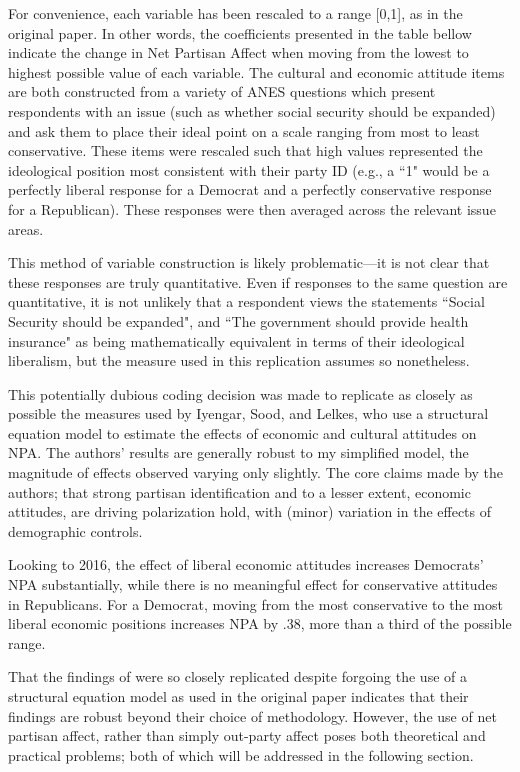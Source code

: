 \documentclass[12pt]{article}
\begin{document}
For convenience, each variable has been rescaled to a range [0,1], as in the original paper. In other words, the coefficients presented in the table bellow indicate the change in Net Partisan Affect when moving from the lowest to highest possible value of each variable. The cultural and economic attitude items are both constructed from a variety of ANES questions which present respondents with an issue (such as whether social security should be expanded) and ask them to place their ideal point on a scale ranging from most to least conservative. These items were rescaled such that high values represented the ideological position most consistent with their party ID (e.g., a ``1" would be a perfectly liberal response for a Democrat and a perfectly conservative response for a Republican). These responses were then averaged across the relevant issue areas.

This method of variable construction is likely problematic---it is not clear that these responses are truly quantitative. Even if responses to the same question are quantitative, it is not unlikely that a respondent views the statements ``Social Security should be expanded", and ``The government should provide health insurance" as being mathematically equivalent in terms of their ideological liberalism, but the measure used in this replication assumes so nonetheless.

This potentially dubious coding decision was made to replicate as closely as possible the measures used by Iyengar, Sood, and Lelkes, who use a structural equation model to estimate the effects of economic and cultural attitudes on NPA. The authors' results are generally robust to my simplified model, the magnitude of effects observed varying only slightly. The core claims made by the authors; that strong partisan identification and to a lesser extent, economic attitudes, are driving polarization hold, with (minor) variation in the effects of demographic controls.

Looking to 2016, the effect of liberal economic attitudes increases Democrats' NPA substantially, while there is no meaningful effect for conservative attitudes in Republicans.  For a Democrat, moving from the most conservative to the most liberal economic positions increases NPA by .38, more than a third of the possible range. 

That the findings of \cite{iyengar2012affect} were so closely replicated despite forgoing the use of a structural equation model as used in the original paper indicates that their findings are robust beyond their choice of methodology. However, the use of net partisan affect, rather than simply out-party affect poses both theoretical and practical problems; both of which will be addressed in the following section.
\end{document}

